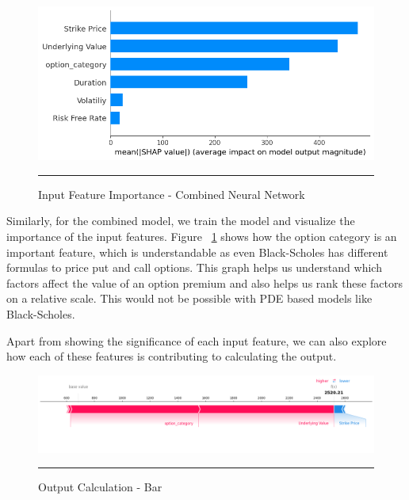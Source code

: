 \begin{figure}[htbp]
  \centering
    \includegraphics[scale=0.55]{Figures/shap2_combined.png}
    \rule{35em}{0.5pt}
  \caption[Input Feature Importance - Combined Neural Network]{Input Feature Importance - Combined Neural Network}
  \label{fig:shap_1_combined}
\end{figure}

Similarly, for the combined model, we train the model and visualize the importance of the input features. Figure ~\ref{fig:shap_1_combined} shows how the option category is an important feature, which is understandable as even Black-Scholes has different formulas to price put and call options. This graph helps us understand which factors affect the value of an option premium and also helps us rank these factors on a relative scale. This would not be possible with PDE based models like Black-Scholes.  

Apart from showing the significance of each input feature, we can also explore how each of these features is contributing to calculating the output. 

\begin{figure}[htbp]
  \centering
    \includegraphics[scale=0.38]{Figures/shap_output_1.png}
    \rule{35em}{0.5pt}
  \caption[Output Calculation - Bar]{Output Calculation - Bar}
  \label{fig:shap_output}
\end{figure}

